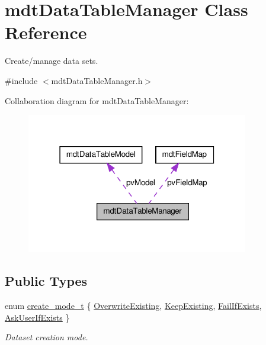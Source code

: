 \hypertarget{classmdt_data_table_manager}{
\section{mdtDataTableManager Class Reference}
\label{classmdt_data_table_manager}
}


Create/manage data sets.  




{\ttfamily \#include $<$mdtDataTableManager.h$>$}



Collaboration diagram for mdtDataTableManager:\nopagebreak
\begin{figure}[H]
\begin{center}
\leavevmode
\includegraphics[width=274pt]{classmdt_data_table_manager__coll__graph}
\end{center}
\end{figure}
\subsection*{Public Types}
\begin{DoxyCompactItemize}
\item 
enum \hyperlink{classmdt_data_table_manager_a2bccf081737f3237ecdbe346dba559a8}{create\_\-mode\_\-t} \{ \hyperlink{classmdt_data_table_manager_a2bccf081737f3237ecdbe346dba559a8aa6a9a7bbd0b4003b3fb560b40b80912d}{OverwriteExisting}, 
\hyperlink{classmdt_data_table_manager_a2bccf081737f3237ecdbe346dba559a8acfd291caff4d096492815d1709b7a3fe}{KeepExisting}, 
\hyperlink{classmdt_data_table_manager_a2bccf081737f3237ecdbe346dba559a8a8d950620af815a15cfefe6843a848f78}{FailIfExists}, 
\hyperlink{classmdt_data_table_manager_a2bccf081737f3237ecdbe346dba559a8a6f1c53b5c2a4fb195fb6c8fa1a536e8c}{AskUserIfExists}
 \}
\begin{DoxyCompactList}\small\item\em Dataset creation mode. \end{DoxyCompactList}\end{DoxyCompactItemize}
